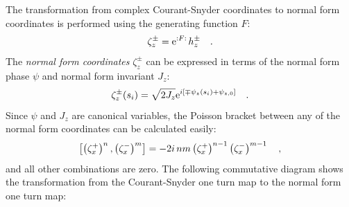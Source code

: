 %
The transformation from complex Courant-Snyder coordinates to normal form coordinates is performed
using the generating function $F$:
%
\begin{equation}
    \zeta_z^\pm = \text{e}^{{:}F{:}\,} h_z^\pm
    \quad .
    \label{eq_hfromz}
\end{equation}
%
The \emph{normal form coordinates} $\zeta_z^\pm$
can be expressed in terms of the normal form phase $\psi$ and normal form invariant $J_z$:
%
\begin{equation}
    \zeta_z^\pm(s_i) = \sqrt{2J_z}\text{e}^{i\left[\mp \psi_z(s_i) + \psi_{z,0} \right]}
    \quad .
\end{equation}
%
Since $\psi$ and $J_z$ are canonical variables, the Poisson bracket between any of the normal form
coordinates can be calculated easily:
%
\begin{equation}
    \left[ \left(\zeta_x^+\right)^{n}, \left(\zeta_x^-\right)^{m}\right] = -2i\,nm\left(\zeta_x^+\right)^{n-1}\left(\zeta_x^-\right)^{m-1}
    \quad ,
    \label{eq_poiss_br_ident}
\end{equation}
and all other combinations are zero.
%
The following commutative diagram shows the transformation from the Courant-Snyder one turn map to 
the normal form one turn map:

